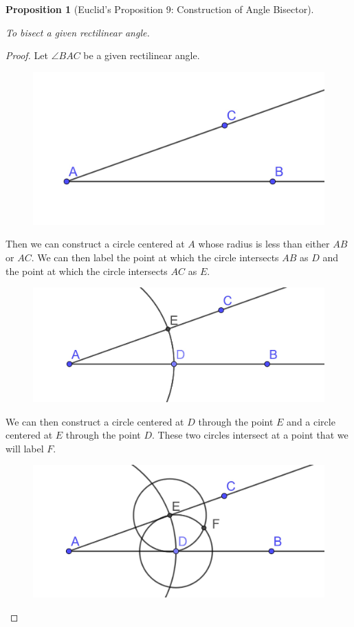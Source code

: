 \documentclass[
]{book}
\newtheorem{proposition}{Proposition}[chapter]
\theoremstyle{definition}
\theoremstyle{definition}
\theoremstyle{definition}
\theoremstyle{definition}
\theoremstyle{remark}
\begin{document}
\begin{proposition}[Euclid's Proposition 9: Construction of Angle Bisector]
\protect\hypertarget{prp:prop9}{}\label{prp:prop9}

To bisect a given rectilinear angle.

\end{proposition}

\begin{proof}

Let \(\angle BAC\) be a given rectilinear angle.

\begin{figure}

{\centering \includegraphics[width=0.4\linewidth]{images/Prop9a} 

}

\end{figure}

Then we can construct a circle centered at \(A\) whose radius is less than either \(AB\) or \(AC\). We can then label the point at which the circle intersects \(AB\) as \(D\) and the point at which the circle intersects \(AC\) as \(E\).

\begin{figure}

{\centering \includegraphics[width=0.4\linewidth]{images/Prop9b} 

}

\end{figure}

We can then construct a circle centered at \(D\) through the point \(E\) and a circle centered at \(E\) through the point \(D\). These two circles intersect at a point that we will label \(F\).

\begin{figure}

{\centering \includegraphics[width=0.4\linewidth]{images/Prop9c} 

}
\end{figure}
\end{proof}
\end{document}

